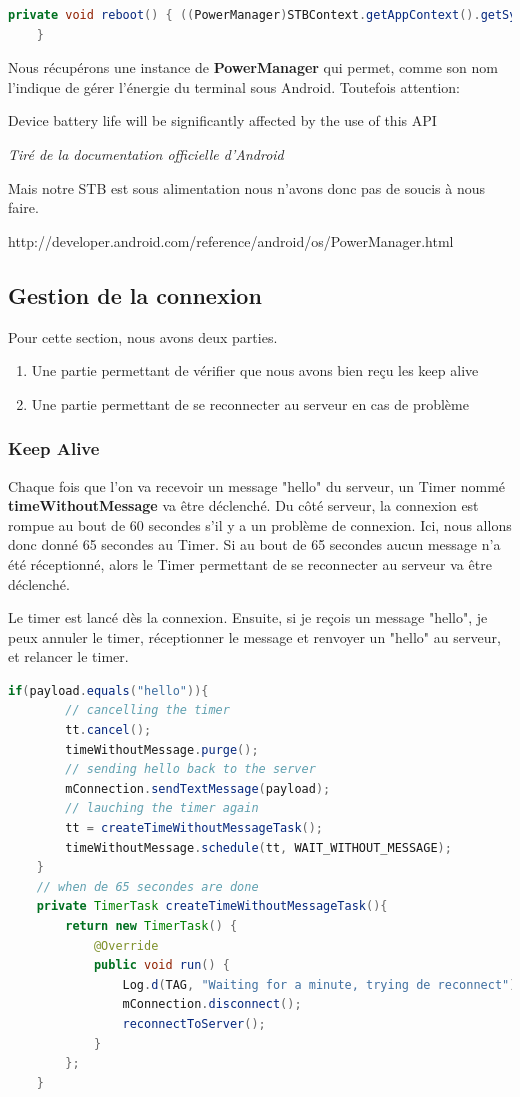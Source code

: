 \begin{lstlisting}[language=Java, caption={Code du reboot}]
private void reboot() {	((PowerManager)STBContext.getAppContext().getSystemService(Context.POWER_SERVICE)).reboot(null);
	}
\end{lstlisting}

Nous récupérons une instance de \textbf{PowerManager} qui permet, comme son nom l'indique de gérer l'énergie du terminal sous Android. Toutefois attention:

\begin{shadequote}
Device battery life will be significantly affected by the use of this API
\par\emph{Tiré de la documentation officielle d'Android}
\end{shadequote}

Mais notre STB est sous alimentation nous n'avons donc pas de soucis à nous faire.

http://developer.android.com/reference/android/os/PowerManager.html
\subsection{Gestion de la connexion}
Pour cette section, nous avons deux parties.
\begin{enumerate}
	\item Une partie permettant de vérifier que nous avons bien reçu les keep alive
	\item Une partie permettant de se reconnecter au serveur en cas de problème
\end{enumerate}
\subsubsection{Keep Alive}

Chaque fois que l'on va recevoir un message "hello" du serveur, un Timer nommé \textbf{timeWithoutMessage} va être déclenché. Du côté serveur, la connexion est rompue au bout de 60 secondes s'il y a un problème de connexion. Ici, nous allons donc donné 65 secondes au Timer. Si au bout de 65 secondes aucun message n'a été réceptionné, alors le Timer permettant de se reconnecter au serveur va être déclenché.

\medskip

Le timer est lancé dès la connexion. Ensuite, si je reçois un message "hello", je peux annuler le timer, réceptionner le message et renvoyer un "hello" au serveur, et relancer le timer.

\begin{lstlisting}[language=Java, caption={Code Keep Alive Android}]
	if(payload.equals("hello")){
		// cancelling the timer
		tt.cancel();
		timeWithoutMessage.purge();
		// sending hello back to the server
		mConnection.sendTextMessage(payload);
		// lauching the timer again
		tt = createTimeWithoutMessageTask();
		timeWithoutMessage.schedule(tt, WAIT_WITHOUT_MESSAGE);
	}
	// when de 65 secondes are done
	private TimerTask createTimeWithoutMessageTask(){
		return new TimerTask() {
			@Override
			public void run() {
				Log.d(TAG, "Waiting for a minute, trying de reconnect");
				mConnection.disconnect();
				reconnectToServer();
			}
		};
	}
\end{lstlisting}

